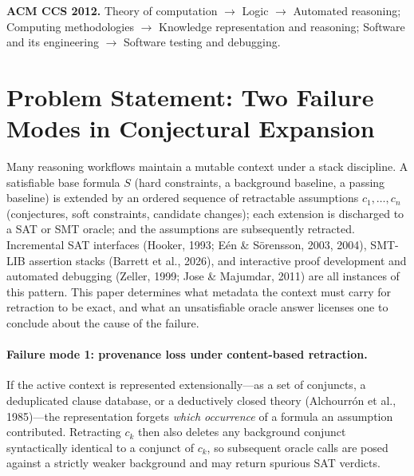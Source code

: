 \documentclass[11pt,reqno]{amsart}
\theoremstyle{plain}
\theoremstyle{definition}
\begin{document}
\maketitle

\noindent\textbf{ACM CCS 2012.}\quad
Theory of computation $\rightarrow$ Logic $\rightarrow$ Automated reasoning;\;
Computing methodologies $\rightarrow$ Knowledge representation and reasoning;\;
Software and its engineering $\rightarrow$ Software testing and debugging.

\medskip

\section{Problem Statement: Two Failure Modes in Conjectural Expansion}
Many reasoning workflows maintain a mutable context under a stack discipline. A
satisfiable base formula $S$ (hard constraints, a background baseline, a passing
baseline) is extended by an ordered sequence of retractable assumptions
$c_1,\dots,c_n$ (conjectures, soft constraints, candidate changes); each extension
is discharged to a SAT or SMT oracle; and the assumptions are subsequently
retracted. Incremental SAT interfaces (Hooker, 1993; E\'en \& S\"orensson, 2003,
2004), SMT-LIB assertion stacks (Barrett et al., 2026), and interactive proof
development and automated debugging (Zeller, 1999; Jose \& Majumdar, 2011) are all
instances of this pattern. This paper determines what metadata the context must
carry for retraction to be exact, and what an unsatisfiable oracle answer licenses
one to conclude about the cause of the failure.

\paragraph{Failure mode 1: provenance loss under content-based retraction.}
If the active context is represented extensionally---as a set of conjuncts, a
deduplicated clause database, or a deductively closed theory (Alchourr\'on et al.,
1985)---the representation forgets \emph{which occurrence} of a formula an
assumption contributed. Retracting $c_k$ then also deletes any background conjunct
syntactically identical to a conjunct of $c_k$, so subsequent oracle calls are
posed against a strictly weaker background and may return spurious SAT verdicts.
\end{document}
